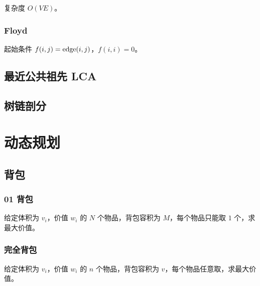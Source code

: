 \documentclass{probook}
\begin{document}
\begin{multicols}{2}
复杂度 $O(VE)$。



\subsection{Floyd}

起始条件 $f(i,j)={\rm edge}(i,j)$，$f(i,i)=0$。



\section{最近公共祖先 LCA}



\section{树链剖分}









\chapter{动态规划}

\section{背包}

\subsection{01 背包}

给定体积为 $v_i$，价值 $w_i$ 的 $N$ 个物品，背包容积为 $M$，每个物品只能取 $1$ 个，求最大价值。



\subsection{完全背包}

给定体积为 $v_i$，价值 $w_i$ 的 $n$ 个物品，背包容积为 $v$，每个物品任意取，求最大价值。


\end{multicols}
\end{document}
